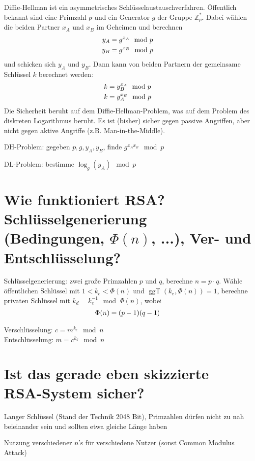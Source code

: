 \documentclass{article}
\DeclareMathOperator{\ggT}{ggT}
\begin{document}
	Diffie-Hellman ist ein asymmetrisches Schlüsselaustauschverfahren. Öffentlich bekannt sind eine Primzahl $p$ und ein Generator $g$ der Gruppe $\mathbb{Z}_p^\ast$. Dabei wählen die beiden Partner $x_A$ und $x_B$ im Geheimen und berechnen
	\begin{align}
		y_A &= g^{x_A} \mod p \notag \\
		y_B &= g^{x_B} \mod p \notag
	\end{align}
	und schicken sich $y_A$ und $y_B$. Dann kann von beiden Partnern der gemeinsame Schlüssel $k$ berechnet werden:
	\begin{align}
		k &= y_B^{x_A} \mod p \notag \\
		k &= y_A^{x_B} \mod p \notag
	\end{align}
	Die Sicherheit beruht auf dem Diffie-Hellman-Problem, was auf dem Problem des diskreten Logarithmus beruht. Es ist (bisher) sicher gegen passive Angriffen, aber nicht gegen aktive Angriffe (z.B. Man-in-the-Middle).
	
	DH-Problem: gegeben $p,g,y_A,y_B$, finde $g^{x_Ax_B} \mod p$
	
	DL-Problem: bestimme $\log_g(y_A)\mod p$
	
	\section*{Wie funktioniert RSA? Schlüsselgenerierung (Bedingungen, $\Phi(n)$, ...), Ver- und Entschlüsselung?}
	
	Schlüsselgenerierung: zwei große Primzahlen $p$ und $q$, berechne $n=p\cdot q$. Wähle öffentlichen Schlüssel mit $1<k_e<\Phi(n)$ und $\ggT(k_e,\Phi(n)) = 1$, berechne privaten Schlüssel mit $k_d = k_e^{-1}\mod \Phi(n)$, wobei
	\begin{align}
		\Phi(n) = (p-1)(q-1) \notag
	\end{align}

	Verschlüsselung: $c = m^{k_e}\mod n$ \\
	Entschlüsselung: $m = c^{k_d}\mod n$
	
	\section*{Ist das gerade eben skizzierte RSA-System sicher?}
	
	Langer Schlüssel (Stand der Technik 2048 Bit), Primzahlen dürfen nicht zu nah beieinander sein und sollten etwa gleiche Länge haben
	
	Nutzung verschiedener $n$'s für verschiedene Nutzer (sonst Common Modulus Attack)
	
\end{document}
